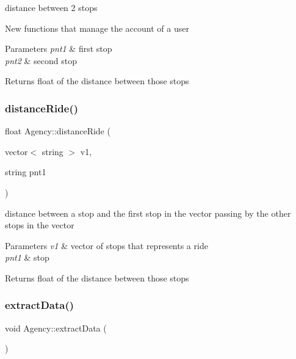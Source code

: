 distance between 2 stops 

New functions that manage the account of a user 
\begin{DoxyParams}{Parameters}
{\em pnt1} & first stop \\
\hline
{\em pnt2} & second stop \\
\hline
\end{DoxyParams}
\begin{DoxyReturn}{Returns}
float of the distance between those stops 
\end{DoxyReturn}
\mbox{\label{group___agency_ga4a3c0e75130deeba5f9fe8dc4cec0468}} 
\subsubsection{\texorpdfstring{distance\+Ride()}{distanceRide()}}
{\footnotesize\ttfamily float Agency\+::distance\+Ride (\begin{DoxyParamCaption}\item[{vector$<$ string $>$}]{v1,  }\item[{string}]{pnt1 }\end{DoxyParamCaption})}



distance between a stop and the first stop in the vector passing by the other stops in the vector 


\begin{DoxyParams}{Parameters}
{\em v1} & vector of stops that represents a ride \\
\hline
{\em pnt1} & stop \\
\hline
\end{DoxyParams}
\begin{DoxyReturn}{Returns}
float of the distance between those stops 
\end{DoxyReturn}
\mbox{\label{group___agency_ga20bc20b90914b5e446b683dcd7f6d0ef}} 
\subsubsection{\texorpdfstring{extract\+Data()}{extractData()}}
{\footnotesize\ttfamily void Agency\+::extract\+Data (\begin{DoxyParamCaption}{ }\end{DoxyParamCaption})}



